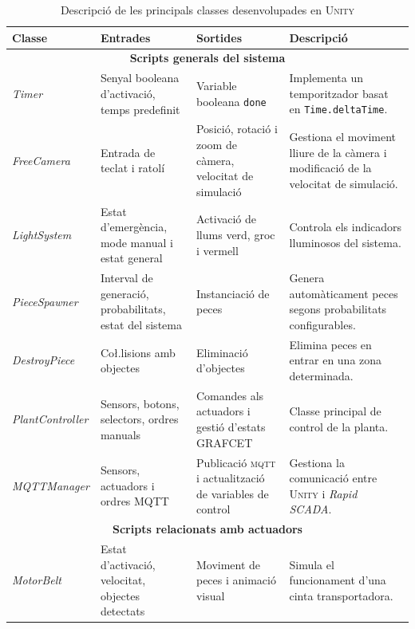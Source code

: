 \documentclass[a4paper,11pt,DIV=13,headings=normal,abstract=true,twoside=semi]{article}
\newcommand{\acro}[1]{\textsc{#1}}
\begin{document}
\begin{table}[H]
\centering
\footnotesize
\caption{Descripció de les principals classes desenvolupades en \acro{Unity}}
\label{tab:unity_classes}
\begin{tabularx}{\textwidth}{|p{2.5cm}|p{3.4cm}|p{3.2cm}|X|}\hline
\textbf{Classe} & \textbf{Entrades} & \textbf{Sortides} & \textbf{Descripció} \\
\hline

\multicolumn{4}{|c|}{\textbf{Scripts generals del sistema}} \\
\hline

\emph{Timer} & Senyal booleana d'activació, temps predefinit 
& Variable booleana \texttt{done} & Implementa un temporitzador basat en \texttt{Time.deltaTime}.  \\
\hline

\emph{FreeCamera }& Entrada de teclat i ratolí
& Posició, rotació i zoom de càmera, velocitat de simulació & Gestiona el moviment lliure de la càmera i modificació de la velocitat de simulació. \\
\hline

\emph{LightSystem} & Estat d'emergència, mode manual i estat general
& Activació de llums verd, groc i vermell & Controla els indicadors lluminosos del sistema. \\
\hline

\emph{PieceSpawner} & Interval de generació, probabilitats, estat del sistema & Instanciació de peces & Genera automàticament peces segons probabilitats configurables. \\
\hline

\emph{DestroyPiece} & Co\l.lisions amb objectes & Eliminació d'objectes & Elimina peces en entrar en una zona determinada. \\
\hline


\emph{PlantController} & Sensors, botons, selectors, ordres manuals
& Comandes als actuadors i gestió d'estats \acro{GRAFCET}
& Classe principal de control de la planta. \\ \hline

\emph{MQTTManager} & Sensors, actuadors i ordres MQTT
& Publicació \acro{mqtt} i actualització de variables de control
& Gestiona la comunicació entre \acro{Unity} i \emph{Rapid SCADA}.  \\ \hline

\multicolumn{4}{|c|}{\textbf{Scripts relacionats amb actuadors}} \\
\hline

\emph{MotorBelt} & Estat d'activació, velocitat, objectes detectats
& Moviment de peces i animació visual
& Simula el funcionament d'una cinta transportadora.  \\
\hline


\end{tabularx}
\end{table}
\end{document}
